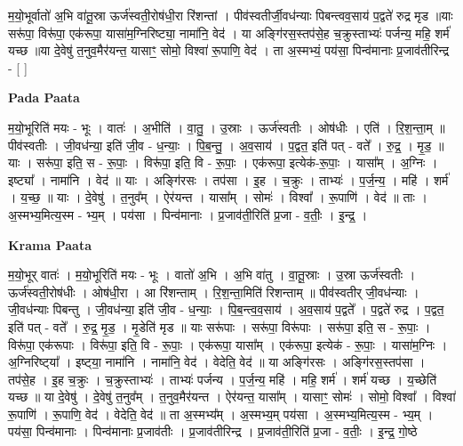 \documentclass[17pt]{extarticle}
\begin{document}
म॒यो॒भूर्वातो॑ अ॒भि वा॑तू॒स्रा ऊर्ज॑स्वती॒रोष॑धी॒रा रि॑शन्तां । पीव॑स्वतीर्जी॒वध॑न्याः पिबन्त्वव॒साय॑ प॒द्वते॑ रुद्र मृड ॥याः सरू॑पा॒ विरू॑पा॒ एक॑रूपा॒ यासा॑म॒ग्निरिष्ट्या॒ नामा॑नि॒ वेद॑ । या अङ्गि॑रस॒स्तप॑से॒ह च॒क्रुस्ताभ्यः॑ पर्जन्य॒ महि॒ शर्म॑ यच्छ ॥या दे॒वेषु॑ त॒नुव॒मैर॑यन्त॒ यासाꣳ॒॒ सोमो॒ विश्वा॑ रू॒पाणि॒ वेद॑ । ता अ॒स्मभ्यं॒ पय॑सा॒ पिन्व॑मानाः प्र॒जाव॑तीरिन्द्र - [  ] \newline

\textbf{Pada Paata} \newline

म॒यो॒भूरिति॑ मयः - भूः । वातः॑ । अ॒भीति॑ । वा॒तु॒ । उ॒स्राः । ऊर्ज॑स्वतीः । ओष॑धीः । एति॑ । रि॒श॒न्ता॒म् ॥ पीव॑स्वतीः । जी॒वध॑न्या॒ इति॑ जी॒व - ध॒न्याः॒ । पि॒ब॒न्तु॒ । अ॒व॒साय॑ । प॒द्वत॒ इति॑ पत् - वते᳚ । रु॒द्र॒ । मृ॒ड॒ ॥ याः । सरू॑पा॒ इति॒ स - रू॒पाः॒ । विरू॑पा॒ इति॒ वि - रू॒पाः॒ । एक॑रूपा॒ इत्येक॑-रू॒पाः॒ । यासा᳚म् । अ॒ग्निः । इष्ट्या᳚ । नामा॑नि । वेद॑ ॥ याः । अङ्गि॑रसः । तप॑सा । इ॒ह । च॒क्रुः । ताभ्यः॑ । प॒र्ज॒न्य॒ । महि॑ । शर्म॑ । य॒च्छ॒ ॥ याः । दे॒वेषु॑ । त॒नुव᳚म् । ऐर॑यन्त । यासा᳚म् । सोमः॑ । विश्वा᳚ । रू॒पाणि॑ । वेद॑ ॥ ताः । अ॒स्मभ्य॒मित्य॒स्म - भ्य॒म् । पय॑सा । पिन्व॑मानाः । प्र॒जाव॑ती॒रिति॑ प्र॒जा - व॒तीः॒ । इ॒न्द्र॒ ।  \newline


\textbf{Krama Paata} \newline

म॒यो॒भूर् वातः॑ । म॒यो॒भूरिति॑ मयः - भूः । वातो॑ अ॒भि । अ॒भि वा॑तु । वा॒तू॒स्राः । उ॒स्रा ऊर्ज॑स्वतीः । ऊर्ज॑स्वती॒रोष॑धीः । ओष॑धी॒रा । आ रि॑शन्ताम् । रि॒श॒न्ता॒मिति॑ रिशन्ताम् ॥ पीव॑स्वतीर् जी॒वध॑न्याः । जी॒वध॑न्याः पिबन्तु । जी॒वध॑न्या॒ इति॑ जी॒व - ध॒न्याः॒ । पि॒ब॒न्त्व॒व॒साय॑ । अ॒व॒साय॑ प॒द्वते᳚ । प॒द्वते॑ रुद्र । प॒द्वत॒ इति॑ पत् - वते᳚ । रु॒द्र॒ मृ॒ड॒ । मृ॒डेति॑ मृड ॥ याः सरू॑पाः । सरू॑पा॒ विरू॑पाः । सरू॑पा॒ इति॒ स - रू॒पाः॒ । विरू॑पा॒ एक॑रूपाः । विरू॑पा॒ इति॒ वि - रू॒पाः॒ । एक॑रूपा॒ यासा᳚म् । एक॑रूपा॒ इत्येक॑ - रू॒पाः॒ । यासा॑म॒ग्निः । अ॒ग्निरिष्ट्‍या᳚ । इष्ट्‍या॒ नामा॑नि । नामा॑नि॒ वेद॑ । वेदेति॒ वेद॑ ॥ या अङ्‍गि॑रसः । अङ्‍गि॑रस॒स्तप॑सा । तप॑से॒ह । इ॒ह च॒क्रुः । च॒क्रुस्ताभ्यः॑ । ताभ्यः॑ पर्जन्य । प॒र्ज॒न्य॒ महि॑ । महि॒ शर्म॑ । शर्म॑ यच्छ । य॒च्छेति॑ यच्छ ॥ या दे॒वेषु॑ । दे॒वेषु॑ त॒नुव᳚म् । त॒नुव॒मैर॑यन्त । ऐर॑यन्त॒ यासा᳚म् । यासाꣳ॒॒ सोमः॑ । सोमो॒ विश्वा᳚ । विश्वा॑ रू॒पाणि॑ । रू॒पाणि॒ वेद॑ । वेदेति॒ वेद॑ ॥ ता अ॒स्मभ्य᳚म् । अ॒स्मभ्य॒म् पय॑सा । अ॒स्मभ्य॒मित्य॒स्म - भ्य॒म् । पय॑सा॒ पिन्व॑मानाः । पिन्व॑मानाः प्र॒जाव॑तीः । प्र॒जाव॑तीरिन्द्र । प्र॒जाव॑ती॒रिति॑ प्र॒जा - व॒तीः॒ । इ॒न्द्र॒ गो॒ष्ठे \newline
\end{document}
